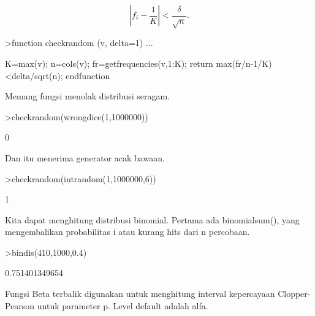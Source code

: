 \documentclass[a4paper,10pt]{article}
\begin{document}
\begin{eulernotebook}
\begin{eulercomment}
\end{eulercomment}
\begin{eulerformula}
\[
\left|f_i-\frac{1}{K}\right| < \frac{\delta}{\sqrt{n}}.
\]
\end{eulerformula}
\begin{eulerprompt}
>function checkrandom (v, delta=1) ...
\end{eulerprompt}
\begin{eulerudf}
    K=max(v); n=cols(v);
    fr=getfrequencies(v,1:K);
    return max(fr/n-1/K)<delta/sqrt(n);
    endfunction
\end{eulerudf}
\begin{eulercomment}
Memang fungsi menolak distribusi seragam.
\end{eulercomment}
\begin{eulerprompt}
>checkrandom(wrongdice(1,1000000))
\end{eulerprompt}
\begin{euleroutput}
  0
\end{euleroutput}
\begin{eulercomment}
Dan itu menerima generator acak bawaan.
\end{eulercomment}
\begin{eulerprompt}
>checkrandom(intrandom(1,1000000,6))
\end{eulerprompt}
\begin{euleroutput}
  1
\end{euleroutput}
\begin{eulercomment}
Kita dapat menghitung distribusi binomial. Pertama ada binomialsum(),
yang mengembalikan probabilitas i atau kurang hits dari n percobaan.
\end{eulercomment}
\begin{eulerprompt}
>bindis(410,1000,0.4)
\end{eulerprompt}
\begin{euleroutput}
  0.751401349654
\end{euleroutput}
\begin{eulercomment}
Fungsi Beta terbalik digunakan untuk menghitung interval kepercayaan
Clopper-Pearson untuk parameter p. Level default adalah alfa.


\end{eulercomment}
\end{eulernotebook}
\end{document}
